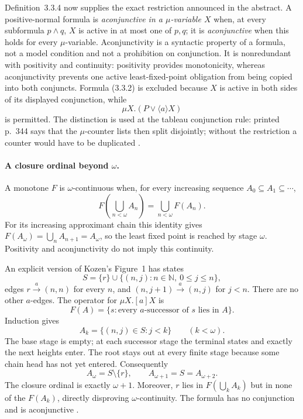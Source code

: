 Definition~3.3.4 now supplies the exact restriction announced in the
abstract.  A positive-normal formula is \emph{aconjunctive in a
\(\mu\)-variable \(X\)} when, at every subformula \(p\land q\), \(X\) is
active in at most one of \(p,q\); it is \emph{aconjunctive} when this holds
for every \(\mu\)-variable.  Aconjunctivity is a syntactic property of a
formula, not a model condition and not a prohibition on conjunction.  It is
nonredundant with positivity and continuity: positivity provides monotonicity,
whereas aconjunctivity prevents one active least-fixed-point obligation from
being copied into both conjuncts.  Formula (3.3.2) is excluded because \(X\)
is active in both sides of its displayed conjunction, while
\[
 \mu X.(P\lor\langle a\rangle X)
\]
is permitted.  The distinction is used at the tableau conjunction rule:
printed p.~344 says that the \(\mu\)-counter lists then split disjointly;
without the restriction a counter would have to be duplicated
\cite[def.~3.3.4, pp.~338--339, 344]{Kozen1983}.

\paragraph{A closure ordinal beyond \(\omega\).}
A monotone \(F\) is \(\omega\)-continuous when, for every
increasing sequence \(A_0\subseteq A_1\subseteq\cdots\),
\[
 F\left(\bigcup_{n<\omega}A_n\right)
       =\bigcup_{n<\omega}F(A_n).
\]
For its increasing approximant chain this identity gives
\(F(A_\omega)=\bigcup_n A_{n+1}=A_\omega\), so the
least fixed point is reached by stage \(\omega\).
Positivity and aconjunctivity do not imply this continuity.

An explicit version of Kozen's Figure~1 has states
\[
 S=\{r\}\cup\{(n,j):n\in\mathbb N,\ 0\leq j\leq n\},
\]
edges \(r\xrightarrow{a}(n,n)\) for every \(n\), and
\((n,j+1)\xrightarrow{a}(n,j)\) for \(j<n\).
There are no other \(a\)-edges. The operator for
\(\mu X.[a]X\) is
\[
 F(A)=\{s:\text{every }a\text{-successor of }s\text{ lies in }A\}.
\]
Induction gives
\[
 A_k=\{(n,j)\in S:j<k\}\qquad(k<\omega).
\]
The base stage is empty; at each successor stage
the terminal states and exactly the next heights
enter. The root stays out at every finite stage
because some chain head has not yet entered.
Consequently
\[
 A_\omega=S\setminus\{r\},\qquad
 A_{\omega+1}=S=A_{\omega+2}.
\]
The closure ordinal is exactly \(\omega+1\).
Moreover, \(r\) lies in \(F(\bigcup_k A_k)\) but
in none of the \(F(A_k)\), directly disproving
\(\omega\)-continuity. The formula has no conjunction
and is aconjunctive \cite[fig.~1, pp.~339--340]{Kozen1983}.

